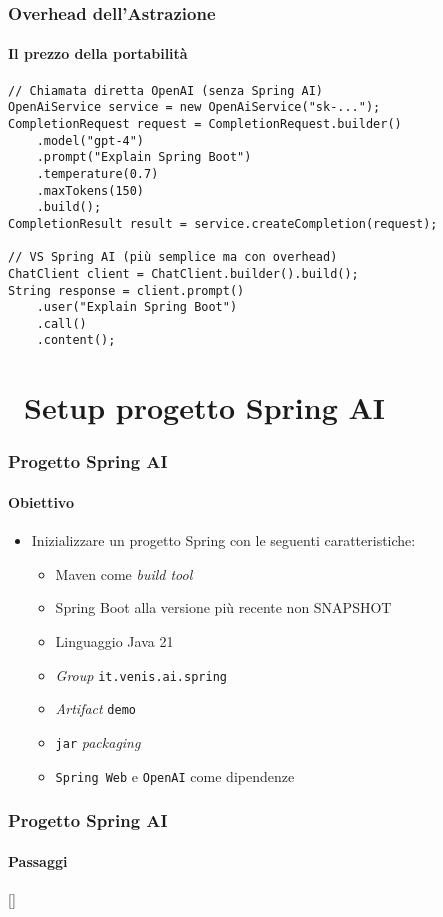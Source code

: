 %
\begin{frame}[t,fragile] \frametitle{Overhead dell'Astrazione}
	{\small
		\framesubtitle{Il prezzo della portabilità}
\begin{verbatim}
// Chiamata diretta OpenAI (senza Spring AI)
OpenAiService service = new OpenAiService("sk-...");
CompletionRequest request = CompletionRequest.builder()
    .model("gpt-4")
    .prompt("Explain Spring Boot")
    .temperature(0.7)
    .maxTokens(150)
    .build();
CompletionResult result = service.createCompletion(request);

// VS Spring AI (più semplice ma con overhead)  
ChatClient client = ChatClient.builder().build();
String response = client.prompt()
    .user("Explain Spring Boot")
    .call()
    .content();
\end{verbatim}
		}
\end{frame}
%
\section{\faWrench\ Setup progetto Spring AI} %
\label{sec:spring-ai-project-setup}
%
\begin{frame}[t,fragile] \frametitle{Progetto Spring AI}
    \framesubtitle{Obiettivo}
    \begin{itemize}[leftmargin=10pt,align=right]
        \item[\alert{\faArrowCircleRight}] Inizializzare un progetto Spring con le seguenti caratteristiche:     
        \begin{itemize}[leftmargin=10pt,align=right]
            \item[\alert{\faArrowCircleRight}] \alert{Maven} come \textit{build tool}
            \item[\alert{\faArrowCircleRight}] Spring Boot alla versione più recente \alert{non SNAPSHOT}
            \item[\alert{\faArrowCircleRight}] Linguaggio \alert{Java 21}
            \item[\alert{\faArrowCircleRight}] \textit{Group} \alert{\texttt{it.venis.ai.spring}}
            \item[\alert{\faArrowCircleRight}] \textit{Artifact} \alert{\texttt{demo}}
            \item[\alert{\faArrowCircleRight}] \alert{\texttt{jar}} \textit{packaging}
            \item[\alert{\faArrowCircleRight}] \alert{\texttt{Spring Web}} e \alert{\texttt{OpenAI}} come dipendenze
        \end{itemize}
    \end{itemize}
\end{frame}
%
\begin{frame}[t,fragile] \frametitle{Progetto Spring AI}
    \framesubtitle{Passaggi}
    []
    \tableofcontents[sections={2}]
\end{frame}
%

